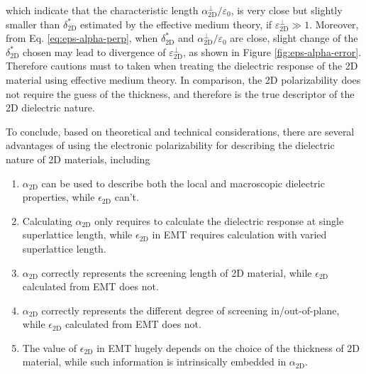 \documentclass[manuscript=suppinfo,email=true,hyperref=true,keywords=false]{achemso}
\begin{document}
which indicate that the characteristic length
$\alpha_{\mathrm{2D}}^{\perp}/\varepsilon_{0}$, is very close but slightly smaller
than $\delta_{\mathrm{2D}}^{*}$ estimated by the effective medium theory,
if $\varepsilon^{\perp}_{\mathrm{2D}} \gg 1$. Moreover, from
Eq. \ref{eq:eps-alpha-perp}, when $\delta_{\mathrm{2D}}^{*}$ and
$\alpha_{\mathrm{2D}}^{\perp}/\varepsilon_{0}$ are close, slight change of the
$\delta_{\mathrm{2D}}^{*}$ chosen may lead to divergence of
$\varepsilon_{\mathrm{2D}}^{\perp}$, as shown in Figure
\ref{fig:eps-alpha-error}. Therefore cautions must to taken when
treating the dielectric response of the 2D material using effective
medium theory. In comparison, the 2D polarizability does not require
the guess of the thickness, and therefore is the true descriptor of
the 2D dielectric nature.

To conclude, based on theoretical and technical considerations, there are several
advantages of using the electronic polarizability for describing the dielectric
nature of 2D materials, including
\begin{enumerate}
\item $\alpha_{\mathrm{2D}}$ can be used to describe both the local and macroscopic dielectric properties, while $\epsilon_{\mathrm{2D}}$ can't.
\item Calculating $\alpha_{\mathrm{2D}}$ only requires to calculate the dielectric response at single superlattice length, while $\epsilon_{\mathrm{2D}}$ in EMT requires calculation with varied superlattice length.
\item $\alpha_{\mathrm{2D}}$ correctly represents the screening length of 2D material, while $\epsilon_{\mathrm{2D}}$ calculated from EMT does not.
\item $\alpha_{\mathrm{2D}}$ correctly represents the different degree of screening in/out-of-plane, while $\epsilon_{\mathrm{2D}}$ calculated from EMT does not.
  
\item The value of $\epsilon_{\mathrm{2D}}$ in EMT hugely depends on the
  choice of the thickness of 2D material, while such information is
  intrinsically embedded in $\alpha_{\mathrm{2D}}$.
\end{enumerate}


\end{document}
